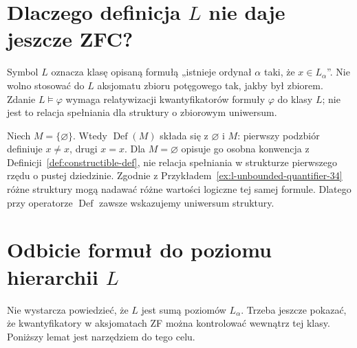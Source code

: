 \section{Dlaczego definicja \texorpdfstring{$L$}{L} nie daje jeszcze ZFC?}
\begin{uwaga}
Symbol $L$ oznacza klasę opisaną formułą „istnieje ordynał $\alpha$ taki,
że $x\in L_\alpha$”. Nie wolno stosować do $L$ aksjomatu zbioru
potęgowego tak, jakby był zbiorem. Zdanie $L\models\varphi$
wymaga relatywizacji kwantyfikatorów formuły $\varphi$ do klasy $L$;
nie jest to relacja spełniania dla struktury o zbiorowym uniwersum.
\end{uwaga}
\begin{przyklad}
Niech $M=\{\varnothing\}$. Wtedy $\operatorname{Def}(M)$
składa się z $\varnothing$ i $M$: pierwszy podzbiór
definiuje $x\ne x$, drugi $x=x$. Dla $M=\varnothing$
opisuje go osobna konwencja z
Definicji~\ref{def:constructible-def}, nie relacja spełniania
w strukturze pierwszego rzędu o pustej dziedzinie.
Zgodnie z Przykładem~\ref{ex:l-unbounded-quantifier-34}
różne struktury mogą nadawać różne wartości logiczne
tej samej formule. Dlatego przy operatorze
$\operatorname{Def}$ zawsze wskazujemy uniwersum struktury.
\end{przyklad}

\section{Odbicie formuł do poziomu hierarchii \texorpdfstring{$L$}{L}}
\label{sec:l-reflection}
Nie wystarcza powiedzieć, że $L$ jest sumą poziomów $L_\alpha$.
Trzeba jeszcze pokazać, że kwantyfikatory w aksjomatach ZF
można kontrolować wewnątrz tej klasy. Poniższy lemat
jest narzędziem do tego celu.

